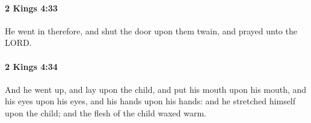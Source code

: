 		\paragraph{2 Kings 4:33} %
			\label{2KINGS-4-33}

			He went in therefore, and shut the door upon them twain, and prayed unto the LORD.


		\paragraph{2 Kings 4:34} %
			\label{2KINGS-4-34}

			And he went up, and lay upon the child, and put his mouth upon his mouth, and his eyes upon his eyes, and his hands upon his hands: and he stretched himself upon the child; and the flesh of the child waxed warm.


